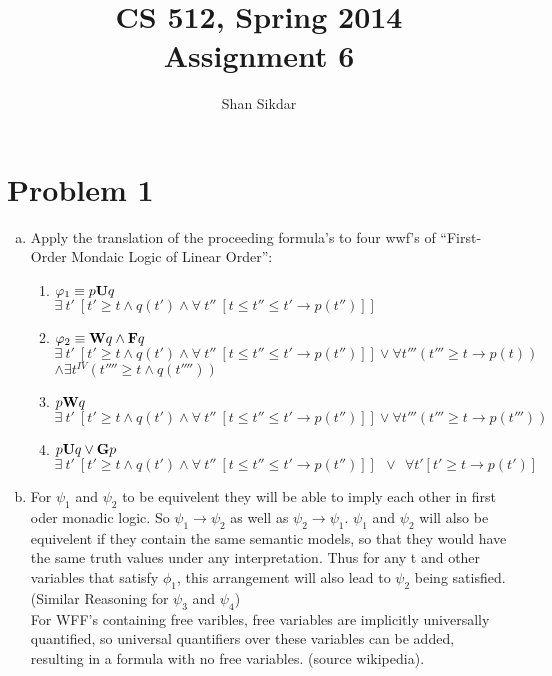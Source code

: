 \documentclass[11pt,leqno,fleqn]{article}
\title{CS 512, Spring 2014
       \\[1ex]
       \textbf{Assignment 6}}
\author{Shan Sikdar}
\date{} %
\begin{document}
\maketitle

\section{Problem 1}
\begin{enumerate}[(a)]
\item Apply the translation of the proceeding formula's to four wwf's of ``First-Order Mondaic Logic of Linear Order'':
\begin{enumerate}[(1)]
 \item $\varphi_1 \equiv p \bold{U} q$\\
 $\exists \ t' \ [t' \geq t \land q(t') \land \forall \ t'' \ [t \leq t'' \leq t' \to p(t'')]]$
 
 \item $\varphi_2 \equiv \bold{W} q \land \bold{F}q$\\
  $\exists \ t' \ [t' \geq t \land q(t') \land \forall \ t'' \ [t \leq t'' \leq t' \to p(t'')]] \lor \forall t''' (t''' \geq t \to  p(t))$
  $\land \exists t^{IV} ( t''''\geq t \land q(t''''))$
 \item $p \bold{W} q$\\
  $\exists \ t' \ [t' \geq t \land q(t') \land \forall \ t'' \ [t \leq t'' \leq t' \to p(t'')]] \lor \forall t'''  (t''' \geq t \to p(t'''))$
 \item $p \bold{U} q \lor \bold{G}p$\\
  $\exists \ t' \ [t' \geq t \land q(t') \land \forall \ t'' \ [t \leq t'' \leq t' \to p(t'')]] \ \ \lor \ \ \forall t' [t' \geq t \to p(t')] $
 
 \end{enumerate}
 \item For $\psi_1$ and $\psi_2$ to be equivelent they will be able to imply each other in first oder monadic logic. So $\psi_1 \to \psi_2$ as well as $\psi_2 \to \psi_1$.  $\psi_1$ and $\psi_2$ will also be equivelent if they contain the same semantic models, so that they would have the same truth values under any interpretation. Thus for any t and other variables that satisfy $\phi_1$, this arrangement will also lead to $\psi_2$ being satisfied. (Similar Reasoning for $\psi_3$ and $\psi_4$)
 \\For WFF's containing free varibles, free variables are implicitly universally quantified, so universal quantifiers over these variables can be added, resulting in a formula with no free variables. (source wikipedia). 


\end{enumerate}
\end{document}
